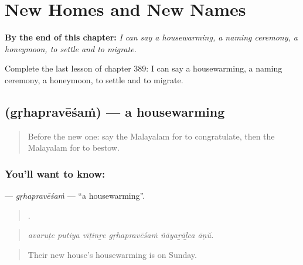 
\chapter{New Homes and New Names}
\label{ch:ml-new-homes-and-new-names}

\begin{chapteropening}
\textbf{By the end of this chapter:} \emph{I can say a housewarming, a naming ceremony, a honeymoon, to settle and to migrate.}

Complete the last lesson of chapter 389: I can say a housewarming, a naming ceremony, a honeymoon, to settle and to migrate.
\end{chapteropening}

\section[\texorpdfstring{\ml{ഗൃഹപ്രവേശം} (gṛhapravēśaṁ)}{ഗൃഹപ്രവേശം (gṛhapravēśaṁ)}]{ (gṛhapravēśaṁ) — a housewarming}

\label{lesson:ML-C389-grhapravesam}



\begin{quote}
Before the new one: say the Malayalam for to congratulate, then the Malayalam for to bestow.
\end{quote}

\subsection*{You'll want to know: }
\textbf{} — \emph{gṛhapravēśaṁ} — \textquotedblleft{}a housewarming\textquotedblright{}.

\begin{quote}
     .
\end{quote}

\begin{quote}
\emph{avaruṭe putiya vīṭinṟe gṛhapravēśaṁ ñāyaṟāḻca āṇŭ.}
\end{quote}

\begin{quote}
Their new house's housewarming is on Sunday.
\end{quote}

